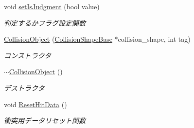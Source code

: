 \begin{DoxyCompactItemize}
void \mbox{\hyperlink{class_collision_object_a3000144caea71e39cbdafebb249fef7e}{set\+Is\+Judgment}} (bool value)
\begin{DoxyCompactList}\small\item\em 判定するかフラグ設定関数 \end{DoxyCompactList}\item 
\mbox{\hyperlink{class_collision_object_aebf806d9b368ad38ad0fe81b4d93c3bb}{Collision\+Object}} (\mbox{\hyperlink{class_collision_shape_base}{Collision\+Shape\+Base}} $\ast$collision\+\_\+shape, int tag)
\begin{DoxyCompactList}\small\item\em コンストラクタ \end{DoxyCompactList}\item 
\mbox{\hyperlink{class_collision_object_a8c4e6916bc5911b8a82498536d5a27e1}{$\sim$\+Collision\+Object}} ()
\begin{DoxyCompactList}\small\item\em デストラクタ \end{DoxyCompactList}\item 
void \mbox{\hyperlink{class_collision_object_a92dd5d21c6674605d290e0d37d64505a}{Reset\+Hit\+Data}} ()
\begin{DoxyCompactList}\small\item\em 衝突用データリセット関数 \end{DoxyCompactList}\end{DoxyCompactItemize}
